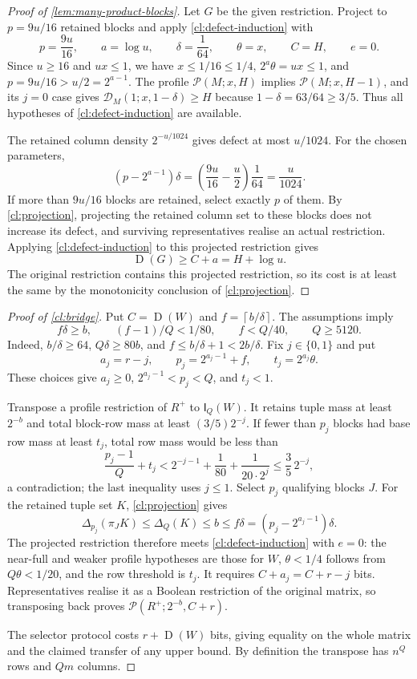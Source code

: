 \documentclass[11pt]{article} \usepackage[utf8]{inputenc}
\theoremstyle{plain} \newtheorem{theorem}{Theorem}[section]
\theoremstyle{definition} \newaliascnt{definition}{theorem}
\newcommand{\D}{\operatorname{D}}
\newcommand{\Int}[2]{\mathsf{I}_{#1}(#2)}
\newcommand{\RP}[3]{\mathcal{P}(#1;#2,#3)}
\newcommand{\ceil}[1]{\left\lceil#1\right\rceil}
\begin{document}
\begin{proof}[Proof of \cref{lem:many-product-blocks}]
Let \(G\) be the given restriction. Project to \(p=9u/16\) retained blocks and
apply \cref{cl:defect-induction} with
\[
p=\frac{9u}{16},\qquad a=\log u,\qquad \delta=\frac1{64},\qquad \theta=x,\qquad
C=H,\qquad e=0.
\]
Since \(u\ge16\) and \(ux\le1\), we have \(x\le1/16\le1/4\),
\(2^a\theta=ux\le1\), and \(p=9u/16>u/2=2^{a-1}\). The profile \(\RP{M}{x}{H}\)
implies \(\RP{M}{x}{H-1}\), and its \(j=0\) case gives \(\mathcal
D_M(1;x,1-\delta)\ge H\) because \(1-\delta=63/64\ge3/5\). Thus all hypotheses
of \cref{cl:defect-induction} are available.

The retained column density \(2^{-u/1024}\) gives defect at most \(u/1024\). For
the chosen parameters,
\[
(p-2^{a-1})\delta =\left(\frac{9u}{16}-\frac u2\right)\frac1{64}
=\frac{u}{1024}.
\]
If more than \(9u/16\) blocks are retained, select exactly \(p\) of them. By
\cref{cl:projection}, projecting the retained column set to these blocks does
not increase its defect, and surviving representatives realise an actual
restriction. Applying \cref{cl:defect-induction} to this projected restriction
gives
\[
\D(G)\ge C+a=H+\log u.
\]
The original restriction contains this projected restriction, so its cost is at
least the same by the monotonicity conclusion of \cref{cl:projection}.
\end{proof}

\begin{proof}[Proof of \cref{cl:bridge}]
Put $C=\D(W)$ and $f=\ceil{b/\delta}$. The assumptions imply
\[
f\delta\ge b,\qquad (f-1)/Q<1/80,\qquad f<Q/40,\qquad Q\ge5120.
\]
Indeed, $b/\delta\ge64$, $Q\delta\ge80b$, and
$f\le b/\delta+1<2b/\delta$. Fix $j\in\{0,1\}$ and put
\[
a_j=r-j,\qquad p_j=2^{a_j-1}+f,\qquad t_j=2^{a_j}\theta.
\]
These choices give $a_j\ge0$, $2^{a_j-1}<p_j<Q$, and $t_j<1$.

Transpose a profile restriction of $R^+$ to $\Int{Q}{W}$. It retains tuple
mass at least $2^{-b}$ and total block-row mass at least $(3/5)2^{-j}$.
If fewer than $p_j$ blocks had base row mass at least $t_j$, total row mass
would be less than
\[
\frac{p_j-1}{Q}+t_j
<2^{-j-1}+\frac1{80}+\frac1{20\cdot2^j}
\le\frac35\,2^{-j},
\]
a contradiction; the last inequality uses $j\le1$. Select $p_j$ qualifying
blocks $J$. For the retained tuple set $K$, \cref{cl:projection} gives
\[
\Delta_{p_j}(\pi_JK)\le\Delta_Q(K)\le b
\le f\delta=(p_j-2^{a_j-1})\delta.
\]
The projected restriction therefore meets \cref{cl:defect-induction} with
$e=0$: the near-full and weaker profile hypotheses are those for $W$,
$\theta<1/4$ follows from $Q\theta<1/20$, and the row threshold is $t_j$.
It requires $C+a_j=C+r-j$ bits. Representatives realise it as a Boolean
restriction of the original matrix, so transposing back proves
$\RP{R^+}{2^{-b}}{C+r}$.

The selector protocol costs $r+\D(W)$ bits, giving equality on the whole
matrix and the claimed transfer of any upper bound. By definition the
transpose has $n^Q$ rows and $Qm$ columns.
\end{proof}
\end{document}
